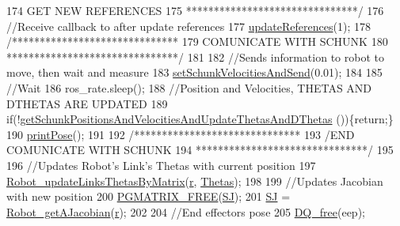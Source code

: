 \begin{DoxyCode}
174 \textcolor{comment}{                         GET NEW REFERENCES}
175 \textcolor{comment}{                *******************************/}
176                 \textcolor{comment}{//Receive callback to after update references}
177                 \hyperlink{classCartesian__pose__controller_a965f86a383eb205df10832626fac98af}{updateReferences}(1);
178                 \textcolor{comment}{/******************************}
179 \textcolor{comment}{                        COMUNICATE WITH SCHUNK}
180 \textcolor{comment}{                *******************************/}
181 
182                 \textcolor{comment}{//Sends information to robot to move, then wait and measure}
183                 \hyperlink{classCartesian__controller_a40d17a9794af8a9a607618bf0ee5efff}{setSchunkVelocitiesAndSend}(0.01);
184 
185                 \textcolor{comment}{//Wait}
186                 ros\_rate.sleep();
188                 \textcolor{comment}{//Position and Velocities, THETAS AND DTHETAS ARE UPDATED}
189                 \textcolor{keywordflow}{if}(!\hyperlink{classCartesian__controller_a0d7a63bac84715f6742db738df246f91}{getSchunkPositionsAndVelocitiesAndUpdateThetasAndDThetas}
      ())\{\textcolor{keywordflow}{return};\}
190                 \hyperlink{classCartesian__pose__controller_ab55ab40074c82ba8cc010fe68fc76d5b}{printPose}();
191 
192                 \textcolor{comment}{/******************************}
193 \textcolor{comment}{                /END    COMUNICATE WITH SCHUNK}
194 \textcolor{comment}{                *******************************/}
195 
196                 \textcolor{comment}{//Updates Robot's Link's Thetas with current position}
197                 \hyperlink{robot_8h_aa1d3aca5132bd5f347f5966d38fbb966}{Robot\_updateLinksThetasByMatrix}(\hyperlink{classCartesian__controller_a5562129951bd802e4ded77fc716c87a0}{r},
      \hyperlink{classCartesian__controller_a0a0f818dad601cd9e3e26cb6959b8eb6}{Thetas});
198 
199                 \textcolor{comment}{//Updates Jacobian with new position}
200                 \hyperlink{gmatrix_8h_a9a73b4e0a77f386c0bae1bba75298d1d}{PGMATRIX\_FREE}(\hyperlink{classCartesian__controller_a98fdac06d136ac3dba0102d97cd5dd36}{SJ});
201                 \hyperlink{classCartesian__controller_a98fdac06d136ac3dba0102d97cd5dd36}{SJ}  = \hyperlink{robot_8h_ab6dd42296709cf38d3468af7afd29563}{Robot\_getAJacobian}(\hyperlink{classCartesian__controller_a5562129951bd802e4ded77fc716c87a0}{r});
202 
204                 \textcolor{comment}{//End effectors pose}
205                 \hyperlink{dualquaternion_8h_a1d21b6cb665c04de4be5aca50804caf4}{DQ\_free}(eep);

\end{DoxyCode}
